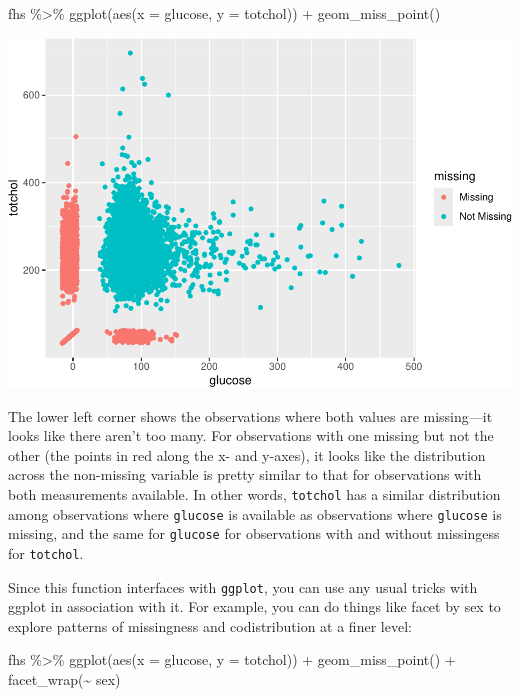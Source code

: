 \documentclass[
]{book}
\newenvironment{Shaded}{\begin{snugshade}}{\end{snugshade}}
\newcommand{\AttributeTok}[1]{\textcolor[rgb]{0.77,0.63,0.00}{#1}}
\newcommand{\FunctionTok}[1]{\textcolor[rgb]{0.00,0.00,0.00}{#1}}
\newcommand{\NormalTok}[1]{#1}
\newcommand{\SpecialCharTok}[1]{\textcolor[rgb]{0.00,0.00,0.00}{#1}}
\begin{document}
\begin{Shaded}
\begin{Highlighting}[]
\NormalTok{fhs }\SpecialCharTok{\%\textgreater{}\%} 
  \FunctionTok{ggplot}\NormalTok{(}\FunctionTok{aes}\NormalTok{(}\AttributeTok{x =}\NormalTok{ glucose, }\AttributeTok{y =}\NormalTok{ totchol)) }\SpecialCharTok{+} 
  \FunctionTok{geom\_miss\_point}\NormalTok{()}
\end{Highlighting}
\end{Shaded}

\includegraphics{adv_epi_analysis_files/figure-latex/unnamed-chunk-177-1.pdf}

The lower left corner shows the observations where both values are missing---it
looks like there aren't too many. For observations with one missing but not the
other (the points in red along the x- and y-axes), it looks like the distribution
across the non-missing variable is pretty similar to that for observations
with both measurements available. In other words, \texttt{totchol} has a similar
distribution among observations where \texttt{glucose} is available as observations
where \texttt{glucose} is missing, and the same for \texttt{glucose} for observations with and without missingess for \texttt{totchol}.

Since this function interfaces with \texttt{ggplot}, you can use any usual tricks with ggplot in association with it. For example, you can do things like facet by sex to explore patterns of missingness and codistribution at a finer level:

\begin{Shaded}
\begin{Highlighting}[]
\NormalTok{fhs }\SpecialCharTok{\%\textgreater{}\%} 
  \FunctionTok{ggplot}\NormalTok{(}\FunctionTok{aes}\NormalTok{(}\AttributeTok{x =}\NormalTok{ glucose, }\AttributeTok{y =}\NormalTok{ totchol)) }\SpecialCharTok{+} 
  \FunctionTok{geom\_miss\_point}\NormalTok{() }\SpecialCharTok{+} 
  \FunctionTok{facet\_wrap}\NormalTok{(}\SpecialCharTok{\textasciitilde{}}\NormalTok{ sex)}
\end{Highlighting}
\end{Shaded}
\end{document}
